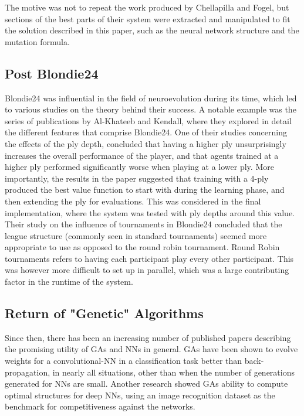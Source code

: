 \documentclass[12pt,a4paper]{article}
\begin{document}
        The motive was not to repeat the work produced by Chellapilla and Fogel, but sections of the best parts of their system were extracted and manipulated to fit the solution described in this paper, such as the neural network structure and the mutation formula. 

    \subsection{Post Blondie24}

        Blondie24 was influential in the field of neuroevolution during its time, which led to various studies on the theory behind their success. A notable example was the series of publications by Al-Khateeb and Kendall, where they explored in detail the different features that comprise Blondie24. One of their studies concerning the effects of the ply depth, concluded that having a higher ply unsurprisingly increases the overall performance of the player, and that agents trained at a higher ply performed significantly worse when playing at a lower ply. More importantly, the results in the paper suggested that training with a 4-ply produced the best value function to start with during the learning phase, and then extending the ply for evaluations. \cite{al-khateeb_effect_2012} This was considered in the final implementation, where the system was tested with ply depths around this value. 
        Their study on the influence of tournaments in Blondie24 concluded that the league structure (commonly seen in standard tournaments) seemed more appropriate to use as opposed to the round robin tournament. \cite{al-khateeb_introducing_2009} Round Robin tournaments refers to having each participant play every other participant. This was however more difficult to set up in parallel, which was a large contributing factor in the runtime of the system.
        
    \subsection{Return of "Genetic" Algorithms}

        Since then, there has been an increasing number of published papers describing the promising utility of GAs and NNs in general. GAs have been shown to evolve weights for a convolutional-NN in a classification task better than back-propagation, in nearly all situations, other than when the number of generations generated for NNs are small. \cite{perez_apply_nodate} Another research showed GAs ability to compute optimal structures for deep NNs, using an image recognition dataset as the benchmark for competitiveness against the networks. \cite{xie_genetic_2017}
        
\end{document}
